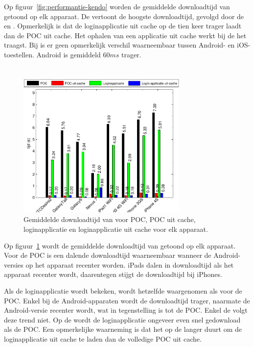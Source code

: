 Op figuur~\ref{fig:performantie-kendo} worden de gemiddelde downloadtijd van \kendo{} getoond op elk apparaat.
De \gtab{} vertoont de hoogste downloadtijd,  gevolgd door de \iphoneiii{} en \htc.
Opmerkelijk is dat de loginapplicatie uit cache op de \nexus{} tien keer trager laadt dan de POC uit cache.
Het ophalen van een applicatie uit cache werkt bij de \gs{} het traagst.
Bij \kendo{} is er geen opmerkelijk verschil waarneembaar tussen Android- en iOS-toestellen.
Android is gemiddeld $60\unit{ms}$ trager.


\section*{\jqm}
\label{app:performantie-jqm}

\begin{figure}
  \centering
  \includegraphics[width=0.75\textwidth]{figuren/performance-jquery.pdf}
  \caption{Gemiddelde downloadtijd van \jqm{} voor POC,  POC uit cache, loginapplicatie en loginapplicatie uit cache voor elk apparaat.}
  \label{fig:performantie-jqm}
\end{figure}

Op figuur~\ref{fig:performantie-jqm} wordt de gemiddelde downloadtijd van \jqm{} getoond op elk apparaat.
Voor de POC is een dalende downloadtijd waarneembaar wanneer de Android-versies op het apparaat recenter worden.
iPads dalen in downloadtijd als het apparaat recenter wordt, daarentegen stijgt de downloadtijd bij iPhones.

Als de loginapplicatie wordt bekeken, wordt hetzelfde waargenomen als voor de POC.
Enkel bij de Android-apparaten wordt de downloadtijd trager, naarmate de Android-versie recenter wordt, wat in tegenstelling is tot de POC.
Enkel de \nexus{} volgt deze trend niet.
Op de \nexus{} wordt de loginapplicatie ongeveer even snel gedownload als de POC.
Een opmerkelijke waarneming is dat het op de \nexus{} langer duurt om de loginapplicatie uit cache te laden dan de volledige POC uit cache.

